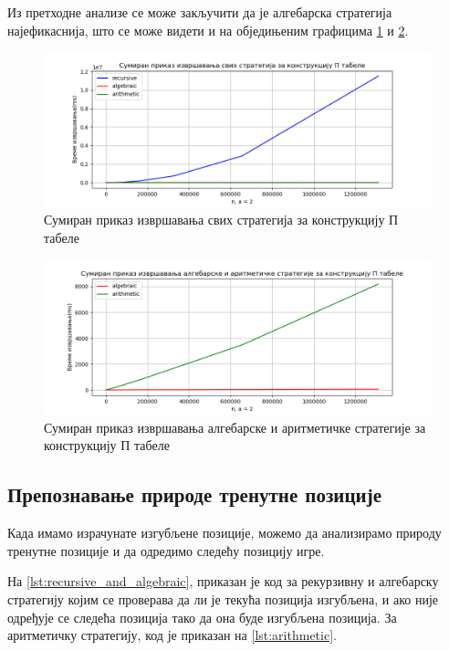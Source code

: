\documentclass[a4paper]{article}
\begin{document}
Из претходне анализе се може закључити да је алгебарска стратегија најефикаснија, што се може видети и на обједињеним графицима \ref{fig:all} и  \ref{fig:algebraicVSarithmetic}.

\begin{figure}[H]
	\caption{Сумиран приказ извршавања свих стратегија за конструкцију П табеле}
	\label{fig:all}
	\begin{center}
		\includegraphics[width=\textwidth]{all.png}
	\end{center}
\end{figure}

\begin{figure}[H]
	\caption{Сумиран приказ извршавања алгебарске и аритметичке стратегије за конструкцију П табеле}
	\label{fig:algebraicVSarithmetic}
	\begin{center}
		\includegraphics[width=\textwidth]{algebraicVSarithmetic.png}
	\end{center}
\end{figure}

\subsection{Препознавање природе тренутне позиције}

Када имамо израчунате изгубљене позиције, можемо да анализирамо природу тренутне позиције и да одредимо следећу позицију игре.

На \ref{lst:recursive_and_algebraic}, приказан је код за рекурзивну и алгебарску стратегију којим се проверава да ли је текућа позиција изгубљена, и ако није одређује се следећа позиција тако да она буде изгубљена позиција.
За аритметичку стратегију, код је приказан на \ref{lst:arithmetic}.
\end{document}
